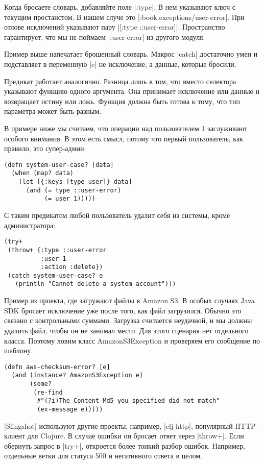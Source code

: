 Когда бросаете словарь, добавляйте поле \spverb|:type|. В нем указывают ключ с
текущим простанстом. В нашем случе это \spverb|:book.exceptions/user-error|. При
отлове исключений указывают пару \spverb|[:type ::user-error]|. Пространство
гарантирует, что мы не поймаем \spverb|:user-error| из другого модуля.

Пример выше напечатает брошенный словарь. Макрос \spverb|catch| достаточно умен
и подставляет в переменную \spverb|e| не исключение, а данные, которые бросили.

Предикат работает аналогично. Разница лишь в том, что вместо селектора указывают
функцию одного аргумента. Она принимает исключение или данные и возвращает
истину или ложь. Функция должна быть готова к тому, что тип параметра может быть
разным.

В примере ниже мы считаем, что операции над пользователем 1 заслуживают особого
внимания. В этом есть смысл, потому что первый пользователь, как правило, это
супер-админ:

\begin{verbatim}
(defn system-user-case? [data]
  (when (map? data)
    (let [{:keys [type user]} data]
      (and (= type ::user-error)
           (= user 1)))))
\end{verbatim}

С таким предикатом любой пользователь удалит себя из системы, кроме
администратора:

\begin{verbatim}
(try+
 (throw+ {:type ::user-error
          :user 1
          :action :delete})
 (catch system-user-case? e
   (println "Cannot delete a system account")))
\end{verbatim}

Пример из проекта, где загружают файлы в Amazon S3. В особых случаях Java SDK
бросает исключение уже после того, как файл загрузился. Обычно это связано с
контрольными суммами. Загрузка считается неудачной, и мы должны удалить файл,
чтобы он не занимал место. Для этого сценария нет отдельного класса. Поэтому
ловим класс AmazonS3Exception и проверяем его сообщение по шаблону.

\begin{verbatim}
(defn aws-checksum-error? [e]
  (and (instance? AmazonS3Exception e)
       (some?
        (re-find
         #"(?i)The Content-Md5 you specified did not match"
         (ex-message e)))))
\end{verbatim}

\spverb|Slingshot| используют другие проекты, например,
\spverb|clj-http|, популярный HTTP-клиент
для Clojure. В случае ошибки он бросает ответ через \spverb|throw+|. Если
обернуть запрос в \spverb|try+|, откроется более тонкий разбор ошибок. Например,
отдельные ветки для статуса 500 и негативного ответа в целом.

